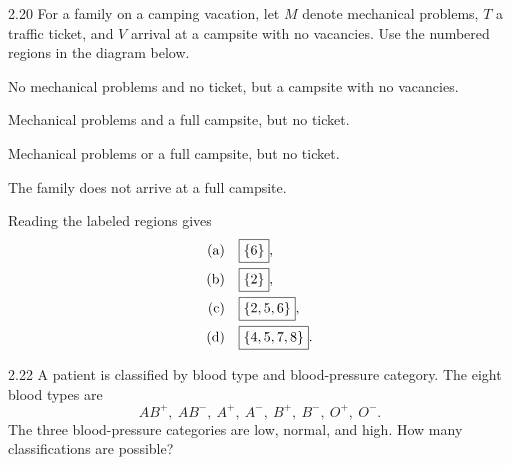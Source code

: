 \documentclass[11pt,oneside]{article}
\begin{document}
\begin{exercise}{2.20}
For a family on a camping vacation, let $M$ denote mechanical problems, $T$ a traffic ticket, and $V$ arrival at a campsite with no vacancies. Use the numbered regions in the diagram below.
\begin{center}
\end{center}

\par
\begin{exercisesubparts}
\item No mechanical problems and no ticket, but a campsite with no vacancies.
\item Mechanical problems and a full campsite, but no ticket.
\item Mechanical problems or a full campsite, but no ticket.
\item The family does not arrive at a full campsite.
\end{exercisesubparts}
\end{exercise}

\begin{solution}
Reading the labeled regions gives
\begin{align*}
\textup{(a)}&\quad\boxed{\{6\}},\\
\textup{(b)}&\quad\boxed{\{2\}},\\
\textup{(c)}&\quad\boxed{\{2,5,6\}},\\
\textup{(d)}&\quad\boxed{\{4,5,7,8\}}.
\end{align*}
\end{solution}

\begin{exercise}{2.22}
A patient is classified by blood type and blood-pressure category. The eight blood types are
\[
AB^+,\ AB^-,\ A^+,\ A^-,\ B^+,\ B^-,\ O^+,\ O^-.
\]
The three blood-pressure categories are low, normal, and high. How many classifications are possible?
\end{exercise}
\end{document}
